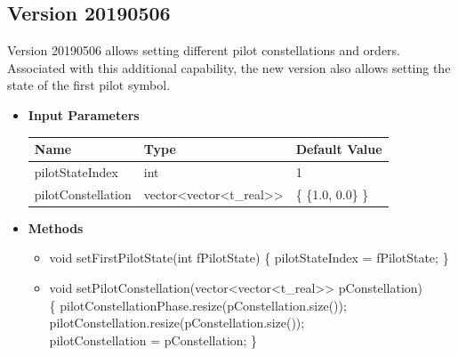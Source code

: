 \begin{refsection}
\subsection*{Version 20190506}

Version 20190506 allows setting different pilot constellations and orders. Associated with this additional capability, the new version also allows setting the state of the first pilot symbol.

\begin{itemize}
  \item \textbf{Input Parameters}
  \begin{table}[H]
    \centering
    \begin{tabular}{|l|l|l|}
    \hline
    Name           & Type           & Default Value     \\ \hline
    pilotStateIndex     & int  & 1 \\ \hline
    pilotConstellation  & vector<vector<t\_real>> & \{ \{1.0, 0.0\} \} \\ \hline
    \end{tabular}
  \end{table}

  \item \textbf{Methods}
  \begin{itemize}
    \item void setFirstPilotState(int fPilotState) \{ pilotStateIndex = fPilotState; \}
    \item void setPilotConstellation(vector<vector<t\_real>> pConstellation) \\ \{  pilotConstellationPhase.resize(pConstellation.size());\\ pilotConstellation.resize(pConstellation.size());\\ pilotConstellation = pConstellation; \}
  \end{itemize}
\end{itemize}

\clearpage
\printbibliography[heading=subbibliography]
\end{refsection}
\cleardoublepage
